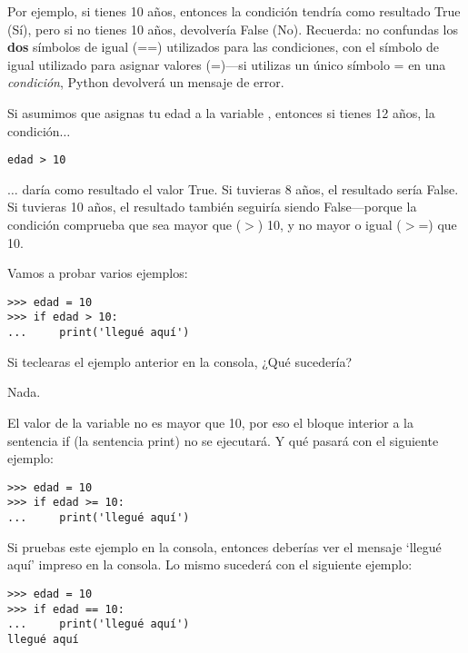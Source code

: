 Por ejemplo, si tienes 10 años, entonces la condición  tendría como resultado True (Sí), pero si no tienes 10 años, devolvería False (No).  Recuerda: no confundas los \textbf{dos} símbolos de igual (==) utilizados para las condiciones, con el símbolo de igual utilizado para asignar valores (=)---si utilizas un único símbolo = en una \emph{condición}, Python devolverá un mensaje de error.
\par
Si asumimos que asignas tu edad a la variable , entonces si tienes 12 años, la condición$\ldots$

\begin{listing}
\begin{verbatim}
edad > 10
\end{verbatim}
\end{listing}

$\ldots$ daría como resultado el valor True.  Si tuvieras 8 años, el resultado sería False.  Si tuvieras 10 años, el resultado también seguiría siendo False---porque la condición comprueba que sea mayor que ($>$) 10, y no mayor o igual ($>$=) que 10.

Vamos a probar varios ejemplos:

\begin{listing}
\begin{verbatim}
>>> edad = 10
>>> if edad > 10:
...     print('llegué aquí')
\end{verbatim}
\end{listing}

\noindent
Si teclearas el ejemplo anterior en la consola, ¿Qué sucedería?
\par
\noindent
Nada.
\par
\noindent
El valor de la variable  no es mayor que 10, por eso el bloque interior a la sentencia if (la sentencia print) no se ejecutará. Y qué pasará con el siguiente ejemplo:

\begin{listing}
\begin{verbatim}
>>> edad = 10
>>> if edad >= 10:
...     print('llegué aquí')
\end{verbatim}
\end{listing}

Si pruebas este ejemplo en la consola, entonces deberías ver el mensaje `llegué aquí' impreso en la consola.  Lo mismo sucederá con el siguiente ejemplo:

\begin{listing}
\begin{verbatim}
>>> edad = 10
>>> if edad == 10:
...     print('llegué aquí')
llegué aquí
\end{verbatim}
\end{listing}


